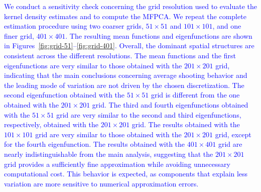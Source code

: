 \documentclass[USenglish]{article}
\theoremstyle{dgthm}
\theoremstyle{dgdef}
\begin{document}
\begin{appendix}
\textcolor{blue}{We conduct a sensitivity check concerning the grid resolution used to evaluate the kernel density estimates and to compute the MFPCA. We repeat the complete estimation procedure using two coarser grids, $51 \times 51$ and $101 \times 101$, and one finer grid, $401 \times 401$. The resulting mean functions and eigenfunctions are shown in Figures~\ref{fig:grid-51}--\ref{fig:grid-401}. Overall, the dominant spatial structures are consistent across the different resolutions. The mean functions and the first eigenfunctions are very similar to those obtained with the $201 \times 201$ grid, indicating that the main conclusions concerning average shooting behavior and the leading mode of variation are not driven by the chosen discretization. The second eigenfunction obtained with the $51 \times 51$ grid is different from the one obtained with the $201 \times 201$ grid. The third and fourth eigenfunctions obtained with the $51 \times 51$ grid are very similar to the second and third eigenfunctions, respectively, obtained with the $201 \times 201$ grid. The results obtained with the $101 \times 101$ grid are very similar to those obtained with the $201 \times 201$ grid, except for the fourth eigenfunction. The results obtained with the $401 \times 401$ grid are nearly indistinguishable from the main analysis, suggesting that the $201 \times 201$ grid provides a sufficiently fine approximation while avoiding unnecessary computational cost. This behavior is expected, as components that explain less variation are more sensitive to numerical approximation errors.}


\end{appendix}
\end{document}
